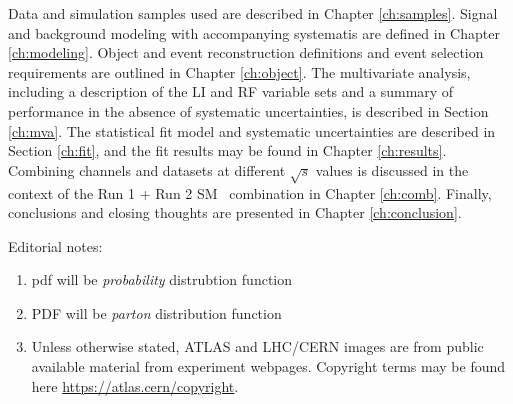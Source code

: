 

Data and simulation samples used are described in Chapter \ref{ch:samples}.  Signal and background modeling with accompanying systematis are defined in Chapter \ref{ch:modeling}.  Object and event reconstruction definitions and event selection requirements are outlined in Chapter \ref{ch:object}.  The multivariate analysis, including a description of the LI and RF variable sets and a summary of performance  in the absence of systematic uncertainties, is described in Section \ref{ch:mva}.  The statistical fit model and systematic uncertainties are described in Section \ref{ch:fit}, and the fit results may be found in Chapter \ref{ch:results}.  Combining channels and datasets at different $\sqrt{s}$ values is discussed in the context of the Run 1 + Run 2 SM \vhbb\, combination in Chapter \ref{ch:comb}.  Finally, conclusions and closing thoughts are presented in Chapter \ref{ch:conclusion}.


Editorial notes: 
\begin{enumerate}
\item pdf will be \emph{probability} distrubtion function
\item PDF will be \emph{parton} distribution function
\item Unless otherwise stated, ATLAS and LHC/CERN images are from public available material from experiment webpages.  Copyright terms may be found here \url{https://atlas.cern/copyright}.
\end{enumerate}
